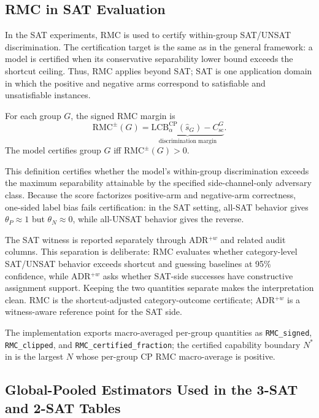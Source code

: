 \documentclass[conference]{IEEEtran}
\theoremstyle{remark}
\newcommand{\LCB}{\mathrm{LCB}}
\newcommand{\RMC}{\mathrm{RMC}}
\newcommand{\shat}{\hat{s}_G}
\newcommand{\shortcutCeiling}{C_{\mathrm{sc}}^{G}}
\begin{document}
\subsection{RMC in SAT Evaluation}
\label{sec:witness}

In the SAT experiments, RMC is used to certify within-group SAT/UNSAT
discrimination.
The certification target is the same as in the general framework: a model is
certified when its conservative separability lower bound exceeds the
shortcut ceiling.
Thus, RMC applies beyond SAT; SAT is one application domain in which
the positive and negative arms correspond to satisfiable and unsatisfiable
instances.

For each group $G$, the signed RMC margin is
\begin{equation}\label{eq:formula-53}
\RMC^{\pm}(G)
=
\underbrace{\LCB^{\mathrm{CP}}_{\alpha}(\shat)-\shortcutCeiling}_{\text{discrimination margin}}.
\end{equation}
The model certifies group $G$ iff $\RMC^{\pm}(G)>0$.

This definition certifies whether the model's within-group discrimination
exceeds the maximum separability attainable by the specified side-channel-only
adversary class.
Because the score factorizes positive-arm and negative-arm correctness,
one-sided label bias fails certification: in the SAT setting, all-SAT
behavior gives $\theta_P\approx 1$ but $\theta_N\approx 0$, while all-UNSAT
behavior gives the reverse.

The SAT witness is reported separately through ADR$^{+w}$ and related audit columns.  This separation is deliberate: RMC evaluates whether category-level SAT/UNSAT behavior exceeds shortcut and guessing baselines at 95\% confidence, while ADR$^{+w}$ asks whether SAT-side successes have constructive assignment support.  Keeping the two quantities separate makes the interpretation clean.  RMC is the shortcut-adjusted category-outcome certificate; ADR$^{+w}$ is a witness-aware reference point for the SAT side.

The implementation exports macro-averaged per-group quantities as
\texttt{RMC\_signed}, \texttt{RMC\_clipped}, and
\texttt{RMC\_certified\_fraction}; the certified capability boundary $N^*$ in
 is the largest $N$ whose per-group CP RMC
macro-average is positive.







\subsection{Global-Pooled Estimators Used in the 3-SAT and 2-SAT Tables}
\label{sec:table_estimators}
\end{document}
